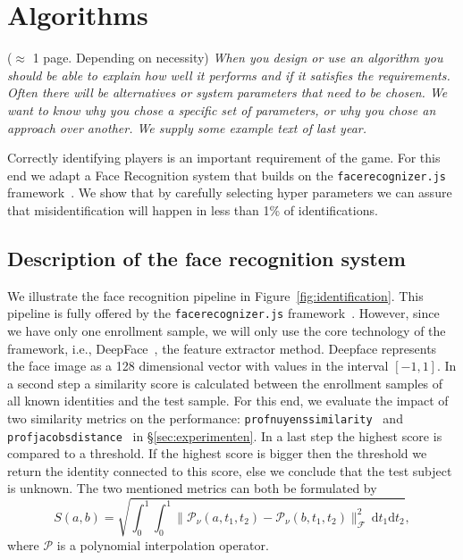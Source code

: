 \documentclass[a4paper,11pt]{article}
\newcommand{\note}[1]{{\colorbox{yellow!40!white}{#1}}}
\newcommand{\exampletext}[1]{{\color{blue!60!black}#1}}
\begin{document}
\section{Algorithms}\label{sec:technical-analysis}

\note{($\approx$ 1 page. Depending on necessity)}
\exampletext{\textit{When you design or use an algorithm you should be able to explain how well it performs and if it satisfies the requirements. Often there will be alternatives or system parameters that need to be chosen. We want to know why you chose a specific set of parameters, or why you chose an approach over another. We supply some example text of last year.}}

\exampletext{
Correctly identifying players is an important requirement of the game. For this end we adapt a Face Recognition system that builds on the \texttt{facerecognizer.js} framework~\cite{website:facerecognizer}. We show that by carefully selecting hyper parameters we can assure that misidentification will happen in less than 1\% of identifications.


\subsection{Description of the face recognition system}

We illustrate the face recognition pipeline in Figure~\ref{fig:identification}. This pipeline is fully offered by the \texttt{facerecognizer.js} framework~\cite{website:facerecognizer}. However, since we have only one enrollment sample, we will only use the core technology of the framework, i.e., DeepFace~\cite{amos2016openface}, the feature extractor method. Deepface represents the face image as a 128 dimensional vector with values in the interval $[-1,1]$. In a second step a similarity score is calculated between the enrollment samples of all known identities and the test sample. For this end, we evaluate the impact of two similarity metrics on the performance: \texttt{profnuyenssimilarity}~\cite{nuyens:2018} and \texttt{profjacobsdistance}~\cite{jacobs:2015} in \S\ref{sec:experimenten}. In a last step the highest score is compared to a threshold. If the highest score is bigger then the threshold we return the identity connected to this score, else we conclude that the test subject is unknown. The two mentioned metrics can both be formulated by
\[
  S(a, b)
  =
  \sqrt{
    \int_0^1 \int_0^1
      \|\mathcal{P}_\nu(a, t_1, t_2) - \mathcal{P}_\nu(b, t_1, t_2)\|_{\mathcal{F}}^2
      \, \mathrm{d}t_1 \mathrm{d}t_2
  }
  ,
\]
where $\mathcal{P}$ is a polynomial interpolation operator.

}
\end{document}

